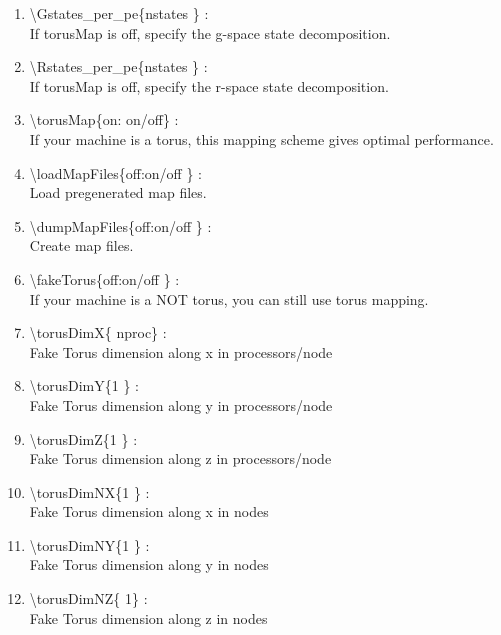 \documentclass[12pt,titlepage]{article}
\begin{document}
\begin{enumerate}
  \vspace{0.15in} 
  \item \textbackslash Gstates\_per\_pe\{nstates \} : \\    
  If torusMap is off, specify the g-space state decomposition.
  \vspace{0.15in} 
  \item \textbackslash Rstates\_per\_pe\{nstates \} : \\    
  If torusMap is off, specify the r-space state decomposition.
  \vspace{0.15in} 
  \item \textbackslash torusMap\{on: on/off\} : \\    
  If your machine is a torus, this mapping scheme gives optimal performance.
  \vspace{0.15in} 
  \item \textbackslash loadMapFiles\{off:on/off \} : \\    
  Load pregenerated map files.
  \vspace{0.15in} 
  \item \textbackslash dumpMapFiles\{off:on/off \} : \\    
  Create map files.
  \vspace{0.15in} 
  \item \textbackslash fakeTorus\{off:on/off \} : \\    
  If your machine is a NOT torus, you can still use torus mapping.
  \vspace{0.15in} 
  \item \textbackslash torusDimX\{ nproc\} : \\    
  Fake Torus dimension along x in processors/node
  \vspace{0.15in} 
  \item \textbackslash torusDimY\{1 \} : \\    
  Fake Torus dimension along y in processors/node
  \vspace{0.15in} 
  \item \textbackslash torusDimZ\{1 \} : \\    
  Fake Torus dimension along z in processors/node
  \vspace{0.15in} 
  \item \textbackslash torusDimNX\{1 \} : \\    
  Fake Torus dimension along x in nodes
  \vspace{0.15in} 
  \item \textbackslash torusDimNY\{1 \} : \\    
  Fake Torus dimension along y in nodes
  \vspace{0.15in} 
  \item \textbackslash torusDimNZ\{ 1\} : \\    
  Fake Torus dimension along z in nodes
\end{enumerate}



\end{document}

